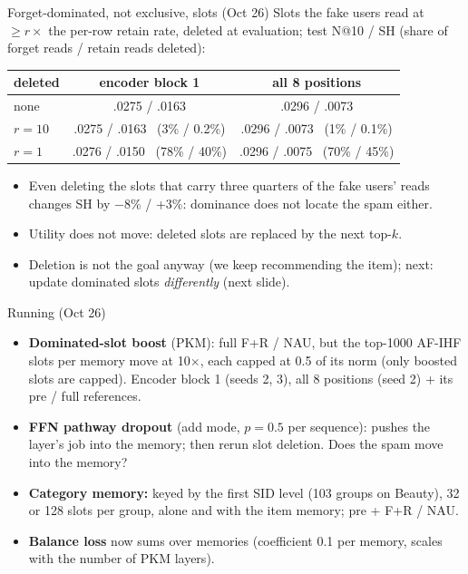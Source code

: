\documentclass{beamer}
\begin{document}
\begin{frame}{Forget-dominated, not exclusive, slots (Oct 26)}
Slots the fake users read at $\geq r\times$ the per-row retain rate, deleted at
evaluation; test N@10 / SH (share of forget reads / retain reads deleted):
\begin{center}
\footnotesize\setlength{\tabcolsep}{3pt}
\begin{tabular}{|l|c|c|}
\hline
deleted & encoder block 1 & all 8 positions \\
\hline
none & .0275 / .0163 & .0296 / .0073 \\
$r=10$ & .0275 / .0163 \ (3\% / 0.2\%) & .0296 / .0073 \ (1\% / 0.1\%) \\
$r=1$ & .0276 / .0150 \ (78\% / 40\%) & .0296 / .0075 \ (70\% / 45\%) \\
\hline
\end{tabular}
\end{center}
\begin{itemize}
  \item Even deleting the slots that carry three quarters of the fake users'
        reads changes SH by $-$8\% / +3\%: dominance does not locate the spam either.
  \item Utility does not move: deleted slots are replaced by the next top-$k$.
  \item Deletion is not the goal anyway (we keep recommending the item);
        next: update dominated slots \emph{differently} (next slide).
\end{itemize}
\end{frame}

\begin{frame}{Running (Oct 26)}
\begin{itemize}
  \item \textbf{Dominated-slot boost} (PKM): full F+R / NAU, but the top-1000
        AF-IHF slots per memory move at 10$\times$, each capped at 0.5 of its
        norm (only boosted slots are capped). Encoder block 1 (seeds 2, 3),
        all 8 positions (seed 2) + its pre / full references.
  \item \textbf{FFN pathway dropout} (add mode, $p=0.5$ per sequence): pushes
        the layer's job into the memory; then rerun slot deletion. Does the
        spam move into the memory?
  \item \textbf{Category memory:} keyed by the first SID level (103 groups on
        Beauty), 32 or 128 slots per group, alone and with the item memory;
        pre + F+R / NAU.
  \item \textbf{Balance loss} now sums over memories (coefficient 0.1 per
        memory, scales with the number of PKM layers).
\end{itemize}
\end{frame}
\end{document}
